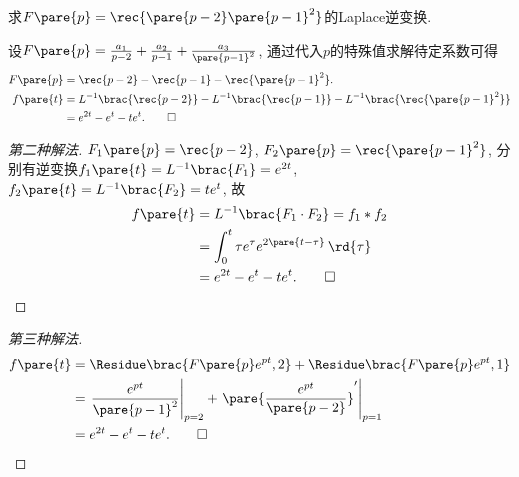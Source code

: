 \documentclass[../ComplexVariable.tex]{subfiles}
\begin{document}
\begin{sample}
    \begin{ex}
        求$\displaystyle F\pare{p} = \rec{\pare{p-2}\pare{p-1}^2}$的Laplace逆变换.
    \end{ex}
    \begin{solution}
        设$F\pare{p} = \frac{a_1}{p-2} + \frac{a_2}{p-1} + \frac{a_3}{\pare{p-1}^2}$, 通过代入$p$的特殊值求解待定系数可得
        \begin{align*}
            F\pare{p} &= \rec{p-2} - \rec{p-1} - \rec{\pare{p-1}^2}. \\
            f\pare{t} &= L^{-1}\brac{\rec{p-2}} - L^{-1}\brac{\rec{p-1}} - L^{-1}\brac{\rec{\pare{p-1}^2}} \\
            &= e^{2t} - e^t - te^t. \qedhere
        \end{align*}
    \end{solution}
    \begin{proof}[第二种解法]
        $\displaystyle F_1\pare{p} = \rec{p-2}$, $\displaystyle F_2\pare{p} = \rec{\pare{p-1}^2}$, 分别有逆变换$f_1\pare{t} = L^{-1}\brac{F_1} = e^{2t}$, $f_2\pare{t}=L^{-1}\brac{F_2}=te^t$, 故
        \begin{align*}
            f\pare{t} &= L^{-1}\brac{F_1\cdot F_2} = f_1 * f_2 \\
            &= \int_0^t \tau e^\tau e^{2\pare{t-\tau}}\,\rd{\tau} \\
            &= e^{2t} - e^t - te^t. \qedhere
        \end{align*}
    \end{proof}
    \begin{proof}[第三种解法]
        \begin{align*}
            f\pare{t} &= \Residue\brac{F\pare{p}e^{pt},2} + \Residue\brac{F\pare{p}e^{pt}, 1} \\
            &= \left.\frac{e^{pt}}{\pare{p-1}^2}\right\vert_{p=2} + \left.\pare{\frac{e^{pt}}{\pare{p-2}}}'\right\vert_{p=1} \\
            &= e^{2t} - e^{t} - te^t. \qedhere
        \end{align*}
    \end{proof}
\end{sample}
\end{document}
